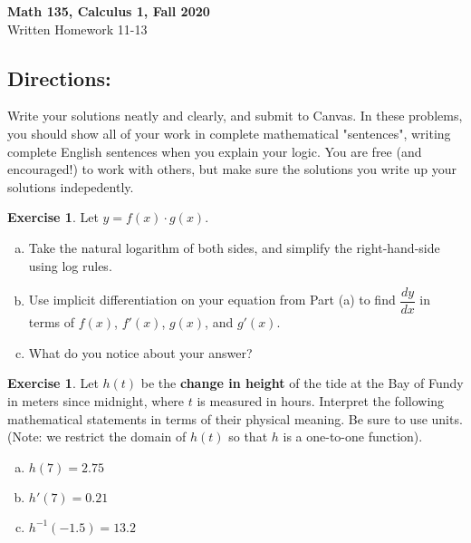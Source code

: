 \documentclass[11pt,reqno,final]{amsart}
\numberwithin{equation}{section}
\numberwithin{figure}{section}
\theoremstyle{definition} %
\newtheorem{exercise}[question]{Exercise}
\begin{document}
\begin{center}
        \textbf{\Large Math 135, Calculus 1, Fall 2020}\\[10pt]
        {\large Written Homework 11-13}
\end{center}

\thispagestyle{empty}

\renewcommand{\thesection}{\Alph{section}}

\subsection*{Directions:}
Write your solutions neatly and clearly, and submit to Canvas.
In these problems, you should show all of your work in complete mathematical "sentences", writing complete English sentences when you explain your logic.
You are free (and encouraged!) to work with others, but make sure the solutions you write up your solutions indepedently.

\begin{exercise}
        Let $y = f(x)\cdot g(x)$.
        \begin{enumerate}[(a)]
        \item Take the natural logarithm of both sides, and simplify the right-hand-side using log rules.
        \item Use implicit differentiation on your equation from Part (a) to find $\dfrac{dy}{dx}$ in terms of $f(x)$, $f'(x)$, $g(x)$, and $g'(x)$.
        \item What do you notice about your answer?
        \end{enumerate}
\end{exercise}

\begin{exercise}
        Let $h(t)$ be the \textbf{change in height} of the tide at the Bay of Fundy in meters since midnight, where $t$ is measured in hours.
        Interpret the following mathematical statements in terms of their physical meaning.
        Be sure to use units.\\
        (Note: we restrict the domain of $h(t)$ so that $h$ is a one-to-one function).
        \begin{enumerate}[(a)]
        \item $h(7) = 2.75$
        \item $h'(7) = 0.21$
        \item $h^{-1}(-1.5) = 13.2$
        \end{enumerate}        
\end{exercise}
\end{document}
